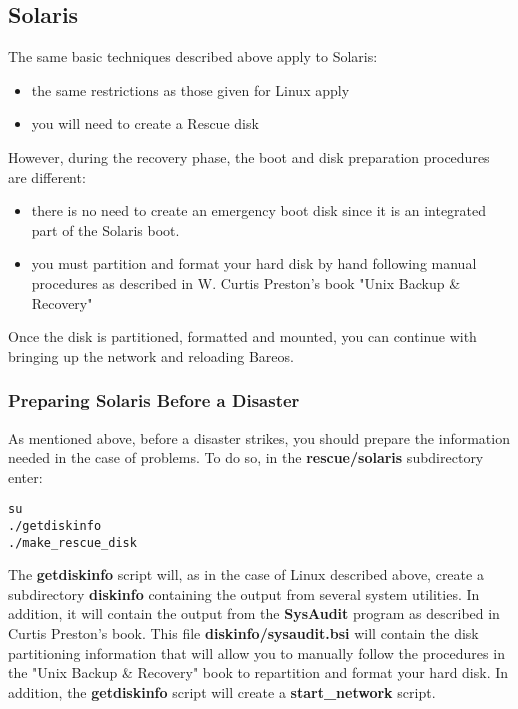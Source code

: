\subsection{Solaris}
\label{solaris}

The same basic techniques described above apply to Solaris:

\begin{itemize}
\item the same restrictions as those given for Linux apply
\item you will need to create a Rescue disk
   \end{itemize}

However, during the recovery phase, the boot and disk preparation procedures
are different:

\begin{itemize}
\item there is no need to create an emergency boot disk  since it is an
   integrated part of the Solaris boot.
\item you must partition and format your hard disk by hand  following manual
   procedures as described in W. Curtis Preston's  book "Unix Backup \&
   Recovery"
\end{itemize}

Once the disk is partitioned, formatted and mounted, you can continue with
bringing up the network and reloading Bareos.

\subsubsection{Preparing Solaris Before a Disaster}

As mentioned above, before a disaster strikes, you should prepare the
information needed in the case of problems. To do so, in the {\bf
rescue/solaris} subdirectory enter:

\footnotesize
\begin{verbatim}
su
./getdiskinfo
./make_rescue_disk
\end{verbatim}
\normalsize

The {\bf getdiskinfo} script will, as in the case of Linux described above,
create a subdirectory {\bf diskinfo} containing the output from several system
utilities. In addition, it will contain the output from the {\bf SysAudit}
program as described in Curtis Preston's book. This file {\bf
diskinfo/sysaudit.bsi} will contain the disk partitioning information that
will allow you to manually follow the procedures in the "Unix Backup \&
Recovery" book to repartition and format your hard disk. In addition, the
{\bf getdiskinfo} script will create a {\bf start\_network} script.

